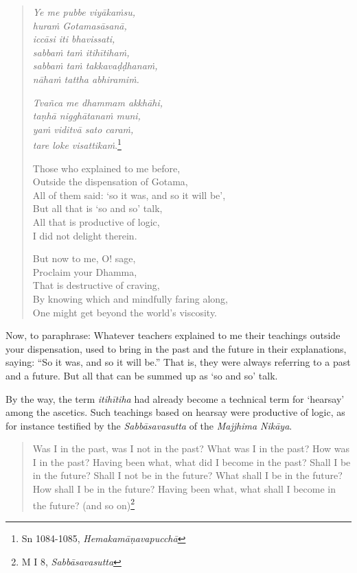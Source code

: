 \begin{quote}
\emph{Ye me pubbe viyākaṁsu,}\\
\emph{huraṁ Gotamasāsanā,}\\
\emph{iccāsi iti bhavissati,}\\
\emph{sabbaṁ taṁ itihītihaṁ,}\\
\emph{sabbaṁ taṁ takkavaḍḍhanaṁ,}\\
\emph{nāhaṁ tattha abhiramiṁ.}

\emph{Tvañca me dhammam akkhāhi,}\\
\emph{taṇhā nigghātanaṁ muni,}\\
\emph{yaṁ viditvā sato caraṁ,}\\
\emph{tare loke visattikaṁ}.\footnote{Sn 1084-1085, \emph{Hemakamāṇavapucchā}}

Those who explained to me before,\\
Outside the dispensation of Gotama,\\
All of them said: `so it was, and so it will be',\\
But all that is `so and so' talk,\\
All that is productive of logic,\\
I did not delight therein.

But now to me, O! sage,\\
Proclaim your Dhamma,\\
That is destructive of craving,\\
By knowing which and mindfully faring along,\\
One might get beyond the world's viscosity.
\end{quote}

Now, to paraphrase: Whatever teachers explained to me their teachings outside your dispensation, used to bring in the past and the future in their explanations, saying: ``So it was, and so it will be.'' That is, they were always referring to a past and a future. But all that can be summed up as `so and so' talk.

By the way, the term \emph{itihītiha} had already become a technical term for `hearsay' among the ascetics. Such teachings based on hearsay were productive of logic, as for instance testified by the \emph{Sabbāsavasutta} of the \emph{Majjhima Nikāya}.

\begin{quote}
Was I in the past, was I not in the past? What was I in the past? How was I in the past? Having been what, what did I become in the past? Shall I be in the future? Shall I not be in the future? What shall I be in the future? How shall I be in the future? Having been what, what shall I become in the future? (and so on)\footnote{M I 8, \emph{Sabbāsavasutta}}
\end{quote}

